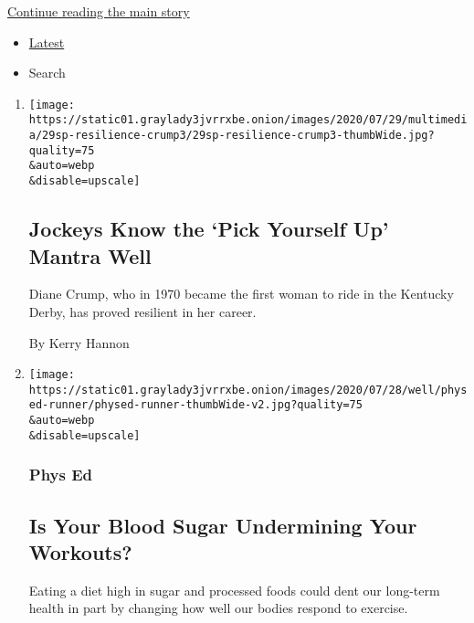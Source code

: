 \protect\hyperlink{after-mid1}{Continue reading the main story}

\begin{itemize}
\tightlist
\item
  \protect\hyperlink{stream-panel}{Latest}
\item
  Search
\end{itemize}

\begin{enumerate}
\def\labelenumi{\arabic{enumi}.}
\item
  \href{/2020/07/29/sports/horse-racing/diane-crump.html}{}

  \texttt{[image: https://static01.graylady3jvrrxbe.onion/images/2020/07/29/multimedia/29sp-resilience-crump3/29sp-resilience-crump3-thumbWide.jpg?quality=75\\\&auto=webp\\\&disable=upscale]}

  \hypertarget{jockeys-know-the-pick-yourself-up-mantra-well}{%
  \subsection{Jockeys Know the `Pick Yourself Up' Mantra
  Well}\label{jockeys-know-the-pick-yourself-up-mantra-well}}

  Diane Crump, who in 1970 became the first woman to ride in the
  Kentucky Derby, has proved resilient in her career.

  By Kerry Hannon
\item
  \href{/2020/07/29/well/move/blood-sugar-diet-foods-workouts-exercise-muscles.html}{}

  \texttt{[image: https://static01.graylady3jvrrxbe.onion/images/2020/07/28/well/physed-runner/physed-runner-thumbWide-v2.jpg?quality=75\\\&auto=webp\\\&disable=upscale]}

  \hypertarget{phys-ed}{%
  \subsubsection{Phys Ed}\label{phys-ed}}

  \hypertarget{is-your-blood-sugar-undermining-your-workouts}{%
  \subsection{Is Your Blood Sugar Undermining Your
  Workouts?}\label{is-your-blood-sugar-undermining-your-workouts}}

  Eating a diet high in sugar and processed foods could dent our
  long-term health in part by changing how well our bodies respond to
  exercise.


\end{enumerate}
